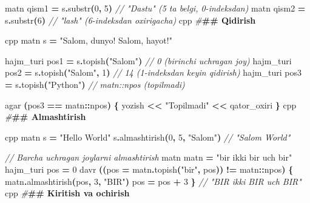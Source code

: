 \documentclass[a4paper,11pt,twoside,openright]{book}
\newenvironment{Shaded}{\begin{snugshade}}{\end{snugshade}}
\newcommand{\CommentTok}[1]{\textcolor[rgb]{0.56,0.35,0.01}{\textit{#1}}}
\newcommand{\DecValTok}[1]{\textcolor[rgb]{0.00,0.00,0.81}{#1}}
\newcommand{\ErrorTok}[1]{\textcolor[rgb]{0.64,0.00,0.00}{\textbf{#1}}}
\newcommand{\NormalTok}[1]{#1}
\newcommand{\OperatorTok}[1]{\textcolor[rgb]{0.81,0.36,0.00}{\textbf{#1}}}
\newcommand{\PreprocessorTok}[1]{\textcolor[rgb]{0.56,0.35,0.01}{\textit{#1}}}
\newcommand{\StringTok}[1]{\textcolor[rgb]{0.31,0.60,0.02}{#1}}
\begin{document}
\begin{Shaded}
\begin{Highlighting}[]
\NormalTok{matn qism1 }\OperatorTok{=}\NormalTok{ s}\OperatorTok{.}\NormalTok{substr}\OperatorTok{(}\DecValTok{0}\OperatorTok{,} \DecValTok{5}\OperatorTok{)}     \CommentTok{// "Dastu" (5 ta belgi, 0{-}indeksdan)}
\NormalTok{matn qism2 }\OperatorTok{=}\NormalTok{ s}\OperatorTok{.}\NormalTok{substr}\OperatorTok{(}\DecValTok{6}\OperatorTok{)}        \CommentTok{// "lash" (6{-}indeksdan oxirigacha)}
\ErrorTok{\textasciigrave{}\textasciigrave{}\textasciigrave{}}\NormalTok{cpp}
\PreprocessorTok{\#}\ErrorTok{\#\# Qidirish}

\ErrorTok{\textasciigrave{}\textasciigrave{}\textasciigrave{}}\NormalTok{cpp}
\NormalTok{matn s }\OperatorTok{=} \StringTok{"Salom, dunyo! Salom, hayot!"}

\NormalTok{hajm\_turi pos1 }\OperatorTok{=}\NormalTok{ s}\OperatorTok{.}\NormalTok{topish}\OperatorTok{(}\StringTok{"Salom"}\OperatorTok{)}      \CommentTok{// 0 (birinchi uchragan joy)}
\NormalTok{hajm\_turi pos2 }\OperatorTok{=}\NormalTok{ s}\OperatorTok{.}\NormalTok{topish}\OperatorTok{(}\StringTok{"Salom"}\OperatorTok{,} \DecValTok{1}\OperatorTok{)}   \CommentTok{// 14 (1{-}indeksdan keyin qidirish)}
\NormalTok{hajm\_turi pos3 }\OperatorTok{=}\NormalTok{ s}\OperatorTok{.}\NormalTok{topish}\OperatorTok{(}\StringTok{"Python"}\OperatorTok{)}     \CommentTok{// matn::npos (topilmadi)}

\NormalTok{agar }\OperatorTok{(}\NormalTok{pos3 }\OperatorTok{==}\NormalTok{ matn}\OperatorTok{::}\NormalTok{npos}\OperatorTok{)} \OperatorTok{\{}
\NormalTok{    yozish }\OperatorTok{\textless{}\textless{}} \StringTok{"Topilmadi"} \OperatorTok{\textless{}\textless{}}\NormalTok{ qator\_oxiri}
\OperatorTok{\}}
\ErrorTok{\textasciigrave{}\textasciigrave{}\textasciigrave{}}\NormalTok{cpp}
\PreprocessorTok{\#}\ErrorTok{\#\# Almashtirish}

\ErrorTok{\textasciigrave{}\textasciigrave{}\textasciigrave{}}\NormalTok{cpp}
\NormalTok{matn s }\OperatorTok{=} \StringTok{"Hello World"}
\NormalTok{s}\OperatorTok{.}\NormalTok{almashtirish}\OperatorTok{(}\DecValTok{0}\OperatorTok{,} \DecValTok{5}\OperatorTok{,} \StringTok{"Salom"}\OperatorTok{)}   \CommentTok{// "Salom World"}

\CommentTok{// Barcha uchragan joylarni almashtirish}
\NormalTok{matn matn }\OperatorTok{=} \StringTok{"bir ikki bir uch bir"}
\NormalTok{hajm\_turi pos }\OperatorTok{=} \DecValTok{0}
\NormalTok{davr }\OperatorTok{((}\NormalTok{pos }\OperatorTok{=}\NormalTok{ matn}\OperatorTok{.}\NormalTok{topish}\OperatorTok{(}\StringTok{"bir"}\OperatorTok{,}\NormalTok{ pos}\OperatorTok{))} \OperatorTok{!=}\NormalTok{ matn}\OperatorTok{::}\NormalTok{npos}\OperatorTok{)} \OperatorTok{\{}
\NormalTok{    matn}\OperatorTok{.}\NormalTok{almashtirish}\OperatorTok{(}\NormalTok{pos}\OperatorTok{,} \DecValTok{3}\OperatorTok{,} \StringTok{"BIR"}\OperatorTok{)}
\NormalTok{    pos }\OperatorTok{=}\NormalTok{ pos }\OperatorTok{+} \DecValTok{3}
\OperatorTok{\}}
\CommentTok{// "BIR ikki BIR uch BIR"}
\ErrorTok{\textasciigrave{}\textasciigrave{}\textasciigrave{}}\NormalTok{cpp}
\PreprocessorTok{\#}\ErrorTok{\#\# Kiritish va o\textquotesingle{}chirish}


\end{Highlighting}
\end{Shaded}
\end{document}
